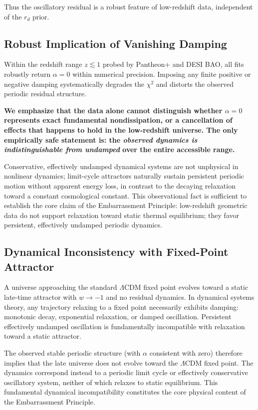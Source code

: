 \documentclass[10pt,a4paper,twocolumn]{article}
\begin{document}
Thus the oscillatory residual is a robust feature of low-redshift data, independent of the $r_d$ prior.

\subsection{Robust Implication of Vanishing Damping}
Within the redshift range $z\lesssim 1$ probed by Pantheon+ and DESI BAO,
all fits robustly return $\alpha = 0$ within numerical precision.
Imposing any finite positive or negative damping
systematically degrades the $\chi^2$ and distorts the observed periodic residual structure.

\textbf{We emphasize that the data alone cannot distinguish whether $\alpha=0$ represents exact fundamental nondissipation, or a cancellation of effects that happens to hold in the low-redshift universe.
The only empirically safe statement is:
the \emph{observed dynamics is indistinguishable from undamped} over the entire accessible range.}

Conservative, effectively undamped dynamical systems are not unphysical in nonlinear dynamics; limit-cycle attractors naturally sustain persistent periodic motion without apparent energy loss, in contrast to the decaying relaxation toward a constant cosmological constant. This observational fact is sufficient to establish the core claim of the Embarrassment Principle:
low-redshift geometric data do not support relaxation toward static thermal equilibrium;
they favor persistent, effectively undamped periodic dynamics.

\subsection{Dynamical Inconsistency with Fixed-Point Attractor}
A universe approaching the standard $\Lambda$CDM fixed point evolves toward a static late-time attractor with $w\to -1$ and no residual dynamics.
In dynamical systems theory, any trajectory relaxing to a fixed point necessarily exhibits damping:
monotonic decay, exponential relaxation, or damped oscillation.
Persistent effectively undamped oscillation is fundamentally incompatible with relaxation toward a static attractor.

The observed stable periodic structure (with $\alpha$ consistent with zero) therefore implies that
the late universe does not evolve toward the $\Lambda$CDM fixed point.
The dynamics correspond instead to a periodic limit cycle or effectively conservative oscillatory system,
neither of which relaxes to static equilibrium.
This fundamental dynamical incompatibility constitutes the core physical content of the Embarrassment Principle.
\end{document}
